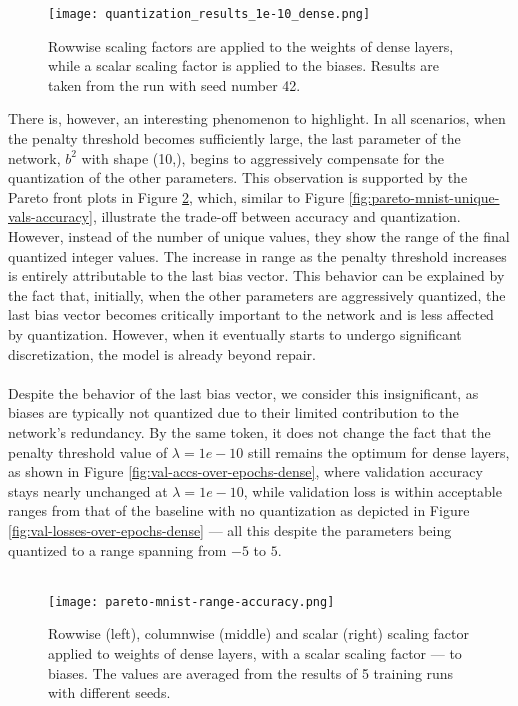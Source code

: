 \begin{figure}[h!]
  \centering
  \texttt{[image: quantization\_results\_1e-10\_dense.png]}
  \caption{Rowwise scaling factors are applied to the weights of dense layers, while a scalar scaling factor is applied to the biases. Results are taken from the run with seed number 42.}
  \label{fig:quantization_results_1e-10_dense}
\end{figure}

\noindent There is, however, an interesting phenomenon to highlight. In all scenarios, 
when the penalty threshold becomes sufficiently large, the last parameter of the network,
\( b^2\) with shape (10,), begins to aggressively compensate for the quantization of the other parameters.
This observation is supported by the Pareto front plots in Figure \ref{fig:pareto-mnist-range-accuracy}, 
which, similar to Figure \ref{fig:pareto-mnist-unique-vals-accuracy}, illustrate the trade-off between accuracy and quantization.
However, instead of the number of unique values, they show the range of the final quantized integer values.
The increase in range as the penalty threshold increases is entirely attributable to the last bias vector. 
This behavior can be explained by the fact that, initially, 
when the other parameters are aggressively quantized, 
the last bias vector becomes critically important to the network and is less affected by quantization. 
However, when it eventually starts to undergo significant discretization, the model is already beyond repair.
\\
\\
Despite the behavior of the last bias vector, we consider this insignificant,
as biases are typically not quantized due to their limited contribution to the network's redundancy.
By the same token, it does not change the fact that the penalty threshold value of \( \lambda = 1e-10 \) still remains the optimum for dense layers,
as shown in Figure \ref{fig:val-accs-over-epochs-dense}, 
where validation accuracy stays nearly unchanged at \( \lambda = 1e-10 \),
while validation loss is within acceptable ranges from 
that of the baseline with no quantization as depicted in Figure \ref{fig:val-losses-over-epochs-dense}
 — all this despite the parameters being quantized to a range spanning from \( -5 \) to \( 5 \).
\\
\\
\begin{figure}[h!]
  \centering
  \texttt{[image: pareto-mnist-range-accuracy.png]}
  \caption{Rowwise (left), columnwise (middle) and scalar (right) scaling factor applied to weights of dense layers, with a scalar scaling factor — to biases.  The values are averaged from the results of 5 training runs with different seeds.}
  \label{fig:pareto-mnist-range-accuracy}
\end{figure}
  
